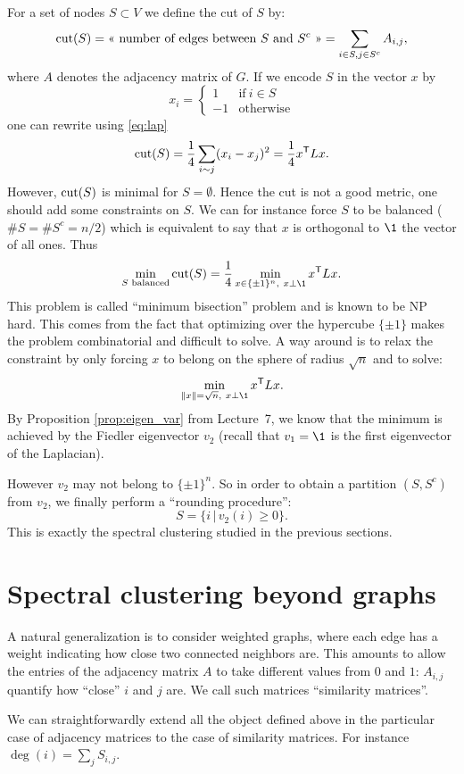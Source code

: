 \documentclass[11pt,nocut]{article}
\begin{document}
For a set of nodes $S \subset V$ we define the cut of $S$ by:
$$
{\rm cut}(S) = \text{<< number of edges between $S$ and $S^c$ >>}
= \sum_{i\in S, j \in S^c} A_{i,j},
$$
where $A$ denotes the adjacency matrix of $G$. If we encode $S$ in the vector $x$ by
$$
x_i =
\begin{cases}
	1 & \text{if} \ i \in S \\
	-1 & \text{otherwise}
\end{cases}
$$
one can rewrite using \eqref{eq:lap}
$$
{\rm cut}(S) = \frac{1}{4} \sum_{i \sim j} (x_i-x_j)^2
=\frac{1}{4} x^{{\sf T}} L x.
$$
However, ${\rm cut}(S)$ is minimal for $S = \emptyset$. Hence the cut is not a good metric, one should add some constraints on $S$.
We can for instance force $S$ to be balanced ($\# S = \# S^c = n/2$) which is equivalent to say that $x$ is orthogonal to $\1$ the vector of all ones. Thus
$$
\min_{S \text{ balanced}} {\rm cut}(S)
= \frac{1}{4} \min_{x \in \{\pm 1\}^n, \ x \perp \1} x^{\sT} L x.
$$
This problem is called ``minimum bisection'' problem and is known to be NP hard. This comes from the fact that optimizing over the hypercube $\{\pm 1\}$ makes the problem combinatorial and difficult to solve. A way around is to relax the constraint by only forcing $x$ to belong on the sphere of radius $\sqrt{n}$ and to solve:
$$
\min_{\|x\| = \sqrt{n}, \ x \perp \1} x^{\sT} L x.
$$
By Proposition \ref{prop:eigen_var} from Lecture~7, we know that the minimum is achieved by the Fiedler eigenvector $v_2$ (recall that $v_1 = \1$ is the first eigenvector of the Laplacian).

However $v_2$ may not belong to $\{\pm 1\}^n$. So in order to obtain a partition $(S,S^c)$ from $v_2$, we finally perform a ``rounding procedure'':
$$
S = \{ i \, | \, v_2(i) \geq 0\}.
$$
This is exactly the spectral clustering studied in the previous sections.

\section{Spectral clustering beyond graphs}

A natural generalization is to consider weighted graphs, where each edge has a weight indicating how close two connected neighbors are.
This amounts to allow the entries of the adjacency matrix $A$ to take different values from $0$ and $1$: $A_{i,j}$ quantify how ``close'' $i$ and $j$ are.
We call such matrices ``similarity matrices''.

We can straightforwardly extend all the object defined above in the particular case of adjacency matrices to the case of similarity matrices. For instance $\deg(i) = \sum_{j} S_{i,j}$.
\end{document}
